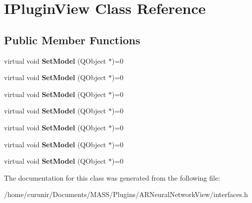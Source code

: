 \hypertarget{class_i_plugin_view}{}\section{I\+Plugin\+View Class Reference}
\label{class_i_plugin_view}
\subsection*{Public Member Functions}
\begin{DoxyCompactItemize}
\item 
virtual void {\bfseries Set\+Model} (Q\+Object $\ast$)=0\hypertarget{class_i_plugin_view_a0da8ecfdc50ba7fb49c6db2dee6fbd81}{}\label{class_i_plugin_view_a0da8ecfdc50ba7fb49c6db2dee6fbd81}

\item 
virtual void {\bfseries Set\+Model} (Q\+Object $\ast$)=0\hypertarget{class_i_plugin_view_a0da8ecfdc50ba7fb49c6db2dee6fbd81}{}\label{class_i_plugin_view_a0da8ecfdc50ba7fb49c6db2dee6fbd81}

\item 
virtual void {\bfseries Set\+Model} (Q\+Object $\ast$)=0\hypertarget{class_i_plugin_view_a0da8ecfdc50ba7fb49c6db2dee6fbd81}{}\label{class_i_plugin_view_a0da8ecfdc50ba7fb49c6db2dee6fbd81}

\item 
virtual void {\bfseries Set\+Model} (Q\+Object $\ast$)=0\hypertarget{class_i_plugin_view_a0da8ecfdc50ba7fb49c6db2dee6fbd81}{}\label{class_i_plugin_view_a0da8ecfdc50ba7fb49c6db2dee6fbd81}

\item 
virtual void {\bfseries Set\+Model} (Q\+Object $\ast$)=0\hypertarget{class_i_plugin_view_a0da8ecfdc50ba7fb49c6db2dee6fbd81}{}\label{class_i_plugin_view_a0da8ecfdc50ba7fb49c6db2dee6fbd81}

\item 
virtual void {\bfseries Set\+Model} (Q\+Object $\ast$)=0\hypertarget{class_i_plugin_view_a0da8ecfdc50ba7fb49c6db2dee6fbd81}{}\label{class_i_plugin_view_a0da8ecfdc50ba7fb49c6db2dee6fbd81}

\item 
virtual void {\bfseries Set\+Model} (Q\+Object $\ast$)=0\hypertarget{class_i_plugin_view_a0da8ecfdc50ba7fb49c6db2dee6fbd81}{}\label{class_i_plugin_view_a0da8ecfdc50ba7fb49c6db2dee6fbd81}

\end{DoxyCompactItemize}


The documentation for this class was generated from the following file\+:\begin{DoxyCompactItemize}
\item 
/home/curunir/\+Documents/\+M\+A\+S\+S/\+Plugins/\+A\+R\+Neural\+Network\+View/interfaces.\+h\end{DoxyCompactItemize}
